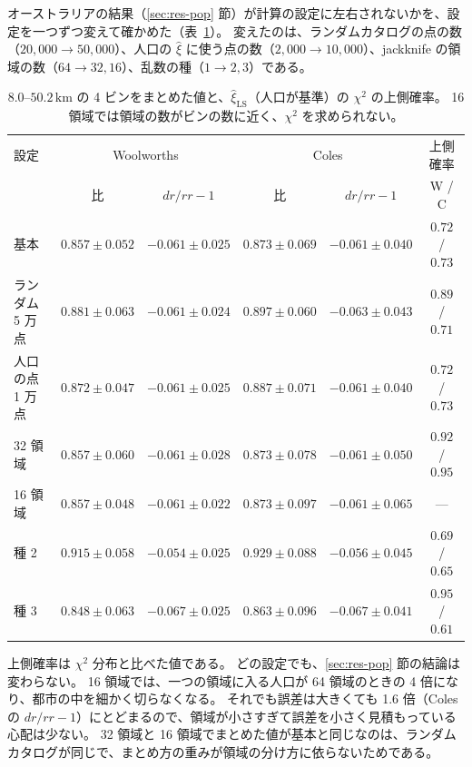 \documentclass[a4paper,11pt]{ltjsarticle}
\begin{document}
オーストラリアの結果（\ref{sec:res-pop} 節）が計算の設定に左右されないかを、設定を一つずつ変えて確かめた（表~\ref{tab:robust}）。
変えたのは、ランダムカタログの点の数（$20{,}000 \to 50{,}000$）、人口の $\hat\xi$ に使う点の数（$2{,}000 \to 10{,}000$）、jackknife の領域の数（$64 \to 32, 16$）、乱数の種（$1 \to 2, 3$）である。
\begin{table}[t]
  \centering
  \caption{$8.0$--$50.2\,\mathrm{km}$ の 4 ビンをまとめた値と、$\hat\xi_{\mathrm{LS}}$（人口が基準）の $\chi^2$ の上側確率。
    16 領域では領域の数がビンの数に近く、$\chi^2$ を求められない。}
  \label{tab:robust}
  \small
  \setlength{\tabcolsep}{4pt}
  \begin{tabular}{lccccc}
    \toprule
    設定 & \multicolumn{2}{c}{Woolworths} & \multicolumn{2}{c}{Coles} & 上側確率 \\
         & 比 & $dr/rr-1$ & 比 & $dr/rr-1$ & W / C \\
    \midrule
    基本             & $0.857 \pm 0.052$ & $-0.061 \pm 0.025$ & $0.873 \pm 0.069$ & $-0.061 \pm 0.040$ & $0.72$ / $0.73$ \\
    ランダム 5 万点  & $0.881 \pm 0.063$ & $-0.061 \pm 0.024$ & $0.897 \pm 0.060$ & $-0.063 \pm 0.043$ & $0.89$ / $0.71$ \\
    人口の点 1 万点  & $0.872 \pm 0.047$ & $-0.061 \pm 0.025$ & $0.887 \pm 0.071$ & $-0.061 \pm 0.040$ & $0.72$ / $0.73$ \\
    32 領域          & $0.857 \pm 0.060$ & $-0.061 \pm 0.028$ & $0.873 \pm 0.078$ & $-0.061 \pm 0.050$ & $0.92$ / $0.95$ \\
    16 領域          & $0.857 \pm 0.048$ & $-0.061 \pm 0.022$ & $0.873 \pm 0.097$ & $-0.061 \pm 0.065$ & --- \\
    種 2             & $0.915 \pm 0.058$ & $-0.054 \pm 0.025$ & $0.929 \pm 0.088$ & $-0.056 \pm 0.045$ & $0.69$ / $0.65$ \\
    種 3             & $0.848 \pm 0.063$ & $-0.067 \pm 0.025$ & $0.863 \pm 0.096$ & $-0.067 \pm 0.041$ & $0.95$ / $0.61$ \\
    \bottomrule
  \end{tabular}
\end{table}
上側確率は $\chi^2$ 分布と比べた値である。
どの設定でも、\ref{sec:res-pop} 節の結論は変わらない。
16 領域では、一つの領域に入る人口が 64 領域のときの 4 倍になり、都市の中を細かく切らなくなる。
それでも誤差は大きくても 1.6 倍（Coles の $dr/rr - 1$）にとどまるので、領域が小さすぎて誤差を小さく見積もっている心配は少ない。
32 領域と 16 領域でまとめた値が基本と同じなのは、ランダムカタログが同じで、まとめ方の重みが領域の分け方に依らないためである。
\end{document}
